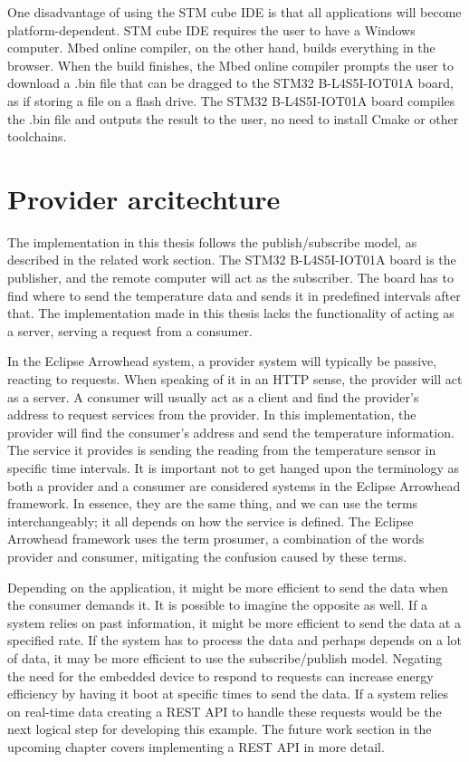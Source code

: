 One disadvantage of using the STM cube IDE is that all applications will become platform-dependent.
STM cube IDE requires the user to have a Windows computer. 
Mbed online compiler, on the other hand, builds everything in the browser.
When the build finishes, the Mbed online compiler prompts the user to download a .bin file that can be dragged to the STM32 B-L4S5I-IOT01A board, as if storing a file on a flash drive.
The STM32 B-L4S5I-IOT01A board compiles the .bin file and outputs the result to the user, no need to install Cmake or other toolchains. 

\section{Provider arcitechture}
The implementation in this thesis follows the publish/subscribe model, as described in the related work section. 
The STM32 B-L4S5I-IOT01A board is the publisher, and the remote computer will act as the subscriber.
The board has to find where to send the temperature data and sends it in predefined intervals after that. 
The implementation made in this thesis lacks the functionality of acting as a server, serving a request from a consumer.


In the Eclipse Arrowhead system, a provider system will typically be passive, reacting to requests.
When speaking of it in an HTTP sense, the provider will act as a server.
A consumer will usually act as a client and find the provider's address to request services from the provider. 
In this implementation, the provider will find the consumer's address and send the temperature information.
The service it provides is sending the reading from the temperature sensor in specific time intervals. 
It is important not to get hanged upon the terminology as both a provider and a consumer are considered systems in the Eclipse Arrowhead framework. 
In essence, they are the same thing, and we can use the terms interchangeably; it all depends on how the service is defined.
The Eclipse Arrowhead framework uses the term prosumer, a combination of the words provider and consumer, mitigating the confusion caused by these terms.

Depending on the application, it might be more efficient to send the data when the consumer demands it. 
It is possible to imagine the opposite as well.
If a system relies on past information, it might be more efficient to send the data at a specified rate.
If the system has to process the data and perhaps depends on a lot of data, it may be more efficient to use the subscribe/publish model. 
Negating the need for the embedded device to respond to requests can increase energy efficiency by having it boot at specific times to send the data.
If a system relies on real-time data creating a REST API to handle these requests would be the next logical step for developing this example.
The future work section in the upcoming chapter covers implementing a REST API in more detail. 

